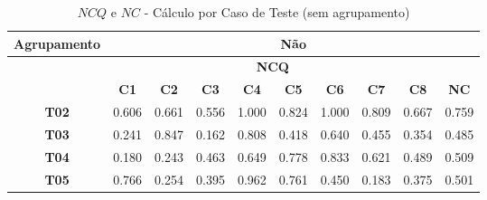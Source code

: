 \begin{table}[htbp]
	\centering
	\caption{$NCQ$ e $NC$ - Cálculo por Caso de Teste (sem agrupamento)}
	\begin{tabular}{|c|ccccccccc|}
		\hline
		\cellcolor[HTML]{F2F2F2}\textbf{Agrupamento} & \multicolumn{9}{c|}{Não} \\ \hline
		\rowcolor[HTML]{D0CECE} 
		\cellcolor[HTML]{D0CECE} & \multicolumn{8}{c|}{\cellcolor[HTML]{D0CECE}\textbf{NCQ}} & \cellcolor[HTML]{D0CECE} \\ \cline{2-9}
		\rowcolor[HTML]{D0CECE} 
		\multirow{-2}{*}{\cellcolor[HTML]{D0CECE}\textbf{Participante}} & \multicolumn{1}{c|}{\cellcolor[HTML]{D0CECE}\textbf{C1}} & \multicolumn{1}{c|}{\cellcolor[HTML]{D0CECE}\textbf{C2}} & \multicolumn{1}{c|}{\cellcolor[HTML]{D0CECE}\textbf{C3}} & \multicolumn{1}{c|}{\cellcolor[HTML]{D0CECE}\textbf{C4}} & \multicolumn{1}{c|}{\cellcolor[HTML]{D0CECE}\textbf{C5}} & \multicolumn{1}{c|}{\cellcolor[HTML]{D0CECE}\textbf{C6}} & \multicolumn{1}{c|}{\cellcolor[HTML]{D0CECE}\textbf{C7}} & \multicolumn{1}{c|}{\cellcolor[HTML]{D0CECE}\textbf{C8}} & \multirow{-2}{*}{\cellcolor[HTML]{D0CECE}\textbf{NC}} \\ \hline
		\textbf{T02} & \multicolumn{1}{c|}{0.606} & \multicolumn{1}{c|}{0.661} & \multicolumn{1}{c|}{0.556} & \multicolumn{1}{c|}{1.000} & \multicolumn{1}{c|}{0.824} & \multicolumn{1}{c|}{1.000} & \multicolumn{1}{c|}{0.809} & \multicolumn{1}{c|}{0.667} & 0.759 \\ \hline
		\rowcolor[HTML]{F2F2F2} 
		\textbf{T03} & \multicolumn{1}{c|}{\cellcolor[HTML]{F2F2F2}0.241} & \multicolumn{1}{c|}{\cellcolor[HTML]{F2F2F2}0.847} & \multicolumn{1}{c|}{\cellcolor[HTML]{F2F2F2}0.162} & \multicolumn{1}{c|}{\cellcolor[HTML]{F2F2F2}0.808} & \multicolumn{1}{c|}{\cellcolor[HTML]{F2F2F2}0.418} & \multicolumn{1}{c|}{\cellcolor[HTML]{F2F2F2}0.640} & \multicolumn{1}{c|}{\cellcolor[HTML]{F2F2F2}0.455} & \multicolumn{1}{c|}{\cellcolor[HTML]{F2F2F2}0.354} & 0.485 \\ \hline
		\textbf{T04} & \multicolumn{1}{c|}{0.180} & \multicolumn{1}{c|}{0.243} & \multicolumn{1}{c|}{0.463} & \multicolumn{1}{c|}{0.649} & \multicolumn{1}{c|}{0.778} & \multicolumn{1}{c|}{0.833} & \multicolumn{1}{c|}{0.621} & \multicolumn{1}{c|}{0.489} & 0.509 \\ \hline
		\rowcolor[HTML]{F2F2F2} 
		\textbf{T05} & \multicolumn{1}{c|}{\cellcolor[HTML]{F2F2F2}0.766} & \multicolumn{1}{c|}{\cellcolor[HTML]{F2F2F2}0.254} & \multicolumn{1}{c|}{\cellcolor[HTML]{F2F2F2}0.395} & \multicolumn{1}{c|}{\cellcolor[HTML]{F2F2F2}0.962} & \multicolumn{1}{c|}{\cellcolor[HTML]{F2F2F2}0.761} & \multicolumn{1}{c|}{\cellcolor[HTML]{F2F2F2}0.450} & \multicolumn{1}{c|}{\cellcolor[HTML]{F2F2F2}0.183} & \multicolumn{1}{c|}{\cellcolor[HTML]{F2F2F2}0.375} & 0.501 \\ \hline

\end{tabular}
\end{table}
